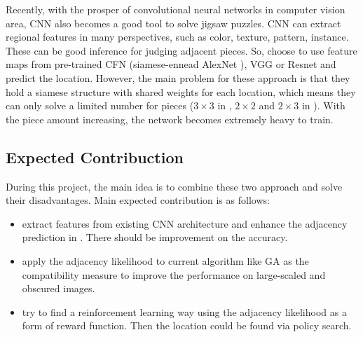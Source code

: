 \documentclass{article}
\begin{document}
Recently, with the prosper of convolutional neural networks in computer vision area, CNN also becomes a good tool to solve jigsaw puzzles. CNN can extract regional features in many perspectives, such as color, texture, pattern, instance. These can be good inference for judging adjacent pieces. So, \cite{deryneural,noroozi2016unsupervised} choose to use feature maps from pre-trained CFN \cite{noroozi2016unsupervised} (siamese-ennead AlexNet \cite{krizhevsky2012imagenet}), VGG \cite{he2016deep} or Resnet \cite{simonyan2014very} and predict the location. However, the main problem for these approach is that they hold a siamese structure with shared weights for each location, which means they can only solve a limited number for pieces ($3\times3$ in \cite{noroozi2016unsupervised}, $2\times2$ and $2\times3$ in \cite{deryneural}). With the piece amount increasing, the network becomes extremely heavy to train.

\subsection{Expected Contribuction}

During this project, the main idea is to combine these two approach and solve their disadvantages. Main expected contribution is as follows:

\begin{itemize}
    \item extract features from existing CNN architecture and enhance the adjacency prediction in \cite{sholomon2016dnn}. There should be improvement on the accuracy.
    \item apply the adjacency likelihood to current algorithm like GA as the compatibility measure to improve the performance on large-scaled and obscured images.
    \item try to find a reinforcement learning way using the adjacency likelihood as a form of reward function. Then the location could be found via policy search.
\end{itemize}



\end{document}
